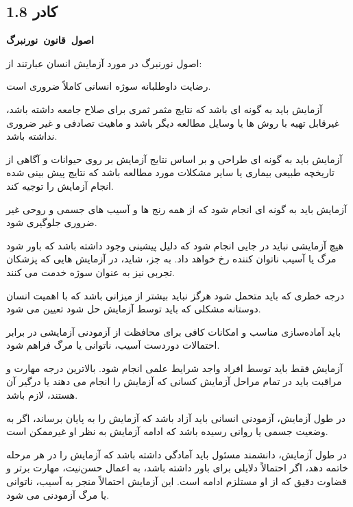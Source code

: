 \begin{tcolorbox}[colback=gray!10,colframe=black,breakable]

    \section*{کادر 1.8}
    \label{sec:کادر 1.8}
    \begin{Large}
        \textbf{\mbox{اصول قانون نورنبرگ}}
    \end{Large}
    \newline
    \newline
    اصول نورنبرگ در مورد آزمایش انسان عبارتند از:

    \begin{description}[leftmargin=0.5cm,style=nextline]
        \item[۱] رضایت داوطلبانه سوژه انسانی کاملاً ضروری است.
        \item[۲] آزمایش باید به گونه ای باشد که نتایج مثمر ثمری برای صلاح جامعه داشته باشد، غیرقابل تهیه با روش ها یا وسایل مطالعه دیگر باشد و ماهیت تصادفی و غیر ضروری نداشته باشد.
        \item[۳] آزمایش باید به گونه ای طراحی و بر اساس نتایج آزمایش بر روی حیوانات و آگاهی از تاریخچه طبیعی بیماری یا سایر مشکلات مورد مطالعه باشد که نتایج پیش بینی شده انجام آزمایش را توجیه کند.
        \item[۴] آزمایش باید به گونه ای انجام شود که از همه رنج ها و آسیب های جسمی و روحی غیر ضروری جلوگیری شود.
        \newpage
        \item[۵] هیچ آزمایشی نباید در جایی انجام شود که دلیل پیشینی وجود داشته باشد که باور شود مرگ یا آسیب ناتوان کننده رخ خواهد داد.
        به جز، شاید، در آزمایش هایی که پزشکان تجربی نیز به عنوان سوژه خدمت می کنند.
        \item[۶] درجه خطری که باید متحمل شود هرگز نباید بیشتر از میزانی باشد که با اهمیت انسان دوستانه مشکلی که باید توسط آزمایش حل شود تعیین می شود.
        \item[۷] باید آماده‌سازی مناسب و امکانات کافی برای محافظت از آزمودنی آزمایشی در برابر احتمالات دوردست آسیب، ناتوانی یا مرگ فراهم شود.
        \item[۸] آزمایش فقط باید توسط افراد واجد شرایط علمی انجام شود.
        بالاترین درجه مهارت و مراقبت باید در تمام مراحل آزمایش کسانی که آزمایش را انجام می دهند یا درگیر آن هستند، لازم باشد.
        \item[۹] در طول آزمایش، آزمودنی انسانی باید آزاد باشد که آزمایش را به پایان برساند، اگر به وضعیت جسمی یا روانی رسیده باشد که ادامه آزمایش به نظر او غیرممکن است.
        \item[۱۰] در طول آزمایش، دانشمند مسئول باید آمادگی داشته باشد که آزمایش را در هر مرحله خاتمه دهد، اگر احتمالاً دلایلی برای باور داشته باشد، به اعمال حسن‌نیت، مهارت برتر و قضاوت دقیق که از او مستلزم ادامه است.
        این آزمایش احتمالاً منجر به آسیب، ناتوانی یا مرگ آزمودنی می شود.
    \end{description}
\end{tcolorbox}

